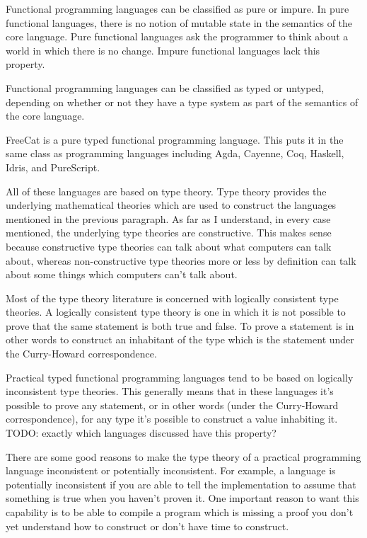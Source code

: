 \documentclass{article}
\begin{document}
Functional programming languages can be classified as pure or impure. In pure functional languages, there is no notion of mutable state in the semantics of the core language. Pure functional languages ask the programmer to think about a world in which there is no change. Impure functional languages lack this property.

Functional programming languages can be classified as typed or untyped, depending on whether or not they have a type system as part of the semantics of the core language.

FreeCat is a pure typed functional programming language. This puts it in the same class as programming languages including Agda, Cayenne, Coq, Haskell, Idris, and PureScript.

All of these languages are based on type theory. Type theory provides the underlying mathematical theories which are used to construct the languages mentioned in the previous paragraph. As far as I understand, in every case mentioned, the underlying type theories are constructive. This makes sense because constructive type theories can talk about what computers can talk about, whereas non-constructive type theories more or less by definition can talk about some things which computers can't talk about.

Most of the type theory literature is concerned with logically consistent type theories. A logically consistent type theory is one in which it is not possible to prove that the same statement is both true and false. To prove a statement is in other words to construct an inhabitant of the type which is the statement under the Curry-Howard correspondence.

Practical typed functional programming languages tend to be based on logically inconsistent type theories. This generally means that in these languages it's possible to prove any statement, or in other words (under the Curry-Howard correspondence), for any type it's possible to construct a value inhabiting it. TODO: exactly which languages discussed have this property?

There are some good reasons to make the type theory of a practical programming language inconsistent or potentially inconsistent. For example, a language is potentially inconsistent if you are able to tell the implementation to assume that something is true when you haven't proven it. One important reason to want this capability is to be able to compile a program which is missing a proof you don't yet understand how to construct or don't have time to construct.
\end{document}
